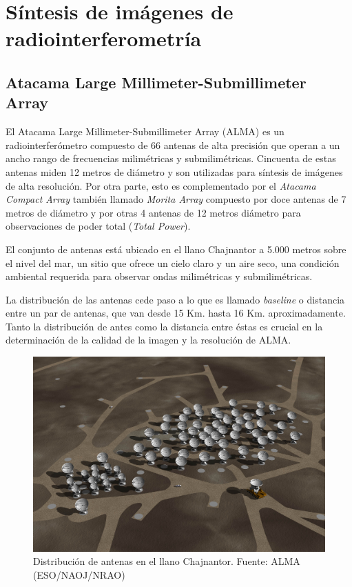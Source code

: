 \chapter{Síntesis de imágenes de radiointerferometría}
\label{cap:imagesynthesisinterferometry}

\section{Atacama Large Millimeter-Submillimeter Array}

El Atacama Large Millimeter-Submillimeter Array (ALMA) es un radiointerferómetro compuesto de 66 antenas de alta precisión que operan a un ancho rango de frecuencias milimétricas y submilimétricas. Cincuenta de estas antenas miden 12 metros de diámetro y son utilizadas para síntesis de imágenes de alta resolución. Por otra parte, esto es complementado por el \textit{Atacama Compact Array} también llamado \textit{Morita Array} compuesto por doce antenas de 7 metros de diámetro y por otras 4 antenas de 12 metros diámetro para observaciones de poder total (\textit{Total Power}).

El conjunto de antenas está ubicado en el llano Chajnantor a 5.000 metros sobre el nivel del mar, un sitio que ofrece un cielo claro y un aire seco, una condición ambiental requerida para observar ondas milimétricas y submilimétricas.

La distribución de las antenas cede paso a lo que es llamado \textit{baseline} o distancia entre un par de antenas, que van desde 15 Km. hasta 16 Km. aproximadamente. Tanto la distribución de antes como la distancia entre éstas es crucial en la determinación de la calidad de la imagen y la resolución de ALMA.

\begin{figure}[h!]
\centering
\includegraphics[scale=0.1]{images/almaarray.jpg}
\caption{Distribución de antenas en el llano Chajnantor. Fuente: ALMA (ESO/NAOJ/NRAO)}
\label{fig:almaarray}
\end{figure}


